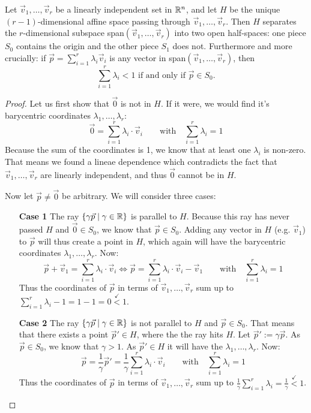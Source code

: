 \begin{lemma}
    \label{lemma:affine_space}
    Let $\vec v_1,\dots,\vec v_r$ be a linearly independent set in $\mathbb{R}^n$, and let $H$ be the unique $(r-1)$-dimensional affine space passing through $\vec v_1,\dots,\vec v_r$. Then $H$ separates the $r$-dimensional subspace span$(\vec v_1,\dots,\vec v_r)$ into two open half-spaces: one piece $S_0$ contains the origin and the other piece $S_1$ does not. Furthermore and more crucially: if $\vec p = \sum_{i=1}^r \lambda_i \vec v_i$ is any vector in span$(\vec v_1,\dots,\vec v_r)$, then
    $$
    \sum_{i=1}^r \lambda_i < 1 \text{ if and only if } \vec p \in S_0.
    $$
\end{lemma}
\begin{proof}
    Let us first show that $\vec 0$ is not in $H$. If it were, we would find it's barycentric coordinates $\lambda_1, \dots, \lambda_r$:
    $$\vec 0 = \sum_{i=1}^r \lambda_i \cdot \vec v_i \qquad\mathrm{with}\quad\sum_{i=1}^{r}\lambda_i = 1$$
    Because the sum of the coordinates is 1, we know that at least one $\lambda_i$ is non-zero. That means we found a lineae dependence which contradicts the fact that $\vec v_1,\dots,\vec v_r$ are linearly independent, and thus $\vec 0$ cannot be in $H$.

    Now let $\vec p \neq \vec 0$ be arbitrary. We will consider three cases:
    \begin{itemize}
        \item[\textbf{Case 1}] The ray $\{\gamma\vec p\mid \gamma \in \mathbb{R}\}$ is parallel to $H$. Because this ray has never passed $H$ and $\vec 0 \in S_0$, we know that $\vec p \in S_0$. Adding any vector in $H$ (e.g. $\vec v_1$) to $\vec p$ will thus create a point in $H$, which again will have the barycentric coordinates $\lambda_1, \dots, \lambda_r$. Now:
        $$\vec p + \vec v_1 = \sum_{i=1}^{r}\lambda_i\cdot \vec v_i \Leftrightarrow \vec p = \sum_{i=1}^{r}\lambda_i\cdot \vec v_i - \vec v_1\qquad\mathrm{with}\quad\sum_{i=1}^{r}\lambda_i = 1$$
        Thus the coordinates of $\vec p$ in terms of $\vec v_1, \dots, \vec v_r$ sum up to $\sum_{i=1}^{r}\lambda_i - 1 = 1 - 1 = 0 \stackrel{\checkmark}{<} 1$.

        \item[\textbf{Case 2}] The ray $\{\gamma\vec p\mid \gamma \in \mathbb{R}\}$ is not parallel to $H$ and $\vec p \in S_0$. That means that there exists a point $\vec p' \in H$, where the the ray hits $H$. Let $\vec p' := \gamma \vec p$. As $\vec p \in S_0$, we know that $\gamma > 1$. As $\vec p' \in H$ it will have the $\lambda_1, \dots, \lambda_r$. Now:
        $$\vec p = \frac{1}{\gamma}\vec p' = \frac{1}{\gamma} \sum_{i=1}^{r}\lambda_i\cdot \vec v_i \qquad\mathrm{with}\quad\sum_{i=1}^{r}\lambda_i = 1$$
        Thus the coordinates of $\vec p$ in terms of $\vec v_1, \dots, \vec v_r$ sum up to $\frac{1}{\gamma}\sum_{i=1}^{r}\lambda_i = \frac{1}{\gamma}\stackrel{\checkmark}{<} 1$.


\end{itemize}
\end{proof}
